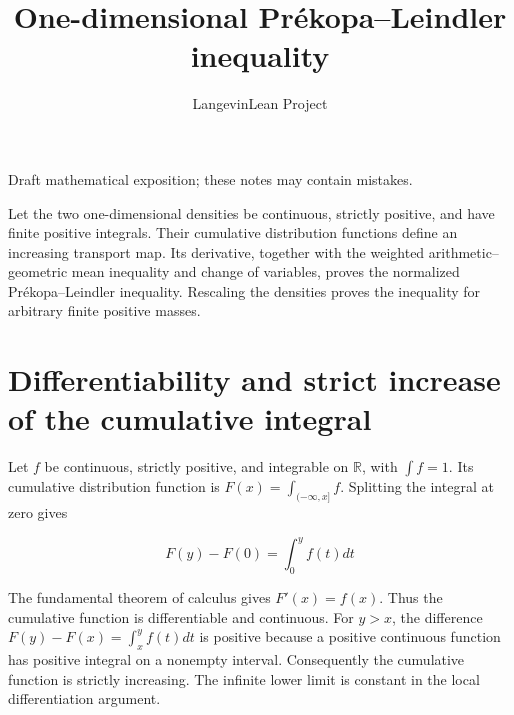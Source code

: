 \documentclass[11pt,a4paper]{article}
\title{\texorpdfstring{One-dimensional Prékopa–Leindler inequality}{One-dimensional Prékopa–Leindler inequality}}
\author{LangevinLean Project}
\date{}
\begin{document}
\maketitle
Draft mathematical exposition; these notes may contain mistakes.


Let the two one-dimensional densities be continuous, strictly positive, and have finite positive integrals. Their cumulative distribution functions define an increasing transport map. Its derivative, together with the weighted arithmetic–geometric mean inequality and change of variables, proves the normalized Prékopa–Leindler inequality. Rescaling the densities proves the inequality for arbitrary finite positive masses.


\section{\texorpdfstring{Differentiability and strict increase of the cumulative integral}{Differentiability and strict increase of the cumulative integral}}


Let \(f\) be continuous, strictly positive, and integrable on \(\mathbb R\), with \(\int f=1\). Its cumulative distribution function is \(F(x)=\int_{(-\infty,x]}f\). Splitting the integral at zero gives

\[F(y)-F(0)=\int_0^y f(t)dt\]

The fundamental theorem of calculus gives \(F'(x)=f(x)\). Thus the cumulative function is differentiable and continuous. For \(y>x\), the difference \(F(y)-F(x)=\int_x^y f(t)dt\) is positive because a positive continuous function has positive integral on a nonempty interval. Consequently the cumulative function is strictly increasing. The infinite lower limit is constant in the local differentiation argument.
\end{document}
